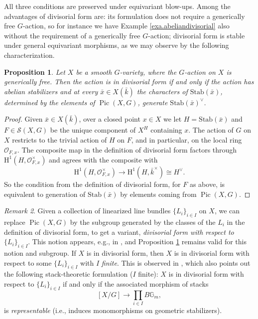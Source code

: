 \documentclass[12pt,reqno]{amsart}
\theoremstyle{plain}
\newtheorem{prop}{Proposition}[section]
\theoremstyle{remark}
\newtheorem{rema}[prop]{Remark}
\theoremstyle{definition}
\numberwithin{equation}{section}
\newcommand{\G}{{\mathbb G}}
\newcommand{\cO}{{\mathcal O}}
\newcommand{\rH}{{\mathrm H}}
\DeclareMathOperator{\Pic}{Pic}
\begin{document}
All three conditions are preserved under equivariant blow-ups.
Among the advantages of
divisorial form are: its formulation does not require a generically free $G$-action,
so for instance we have
Example \ref{exa.abeliandivisorial} also 
without the requirement of a generically free $G$-action;
divisorial form
is stable under general equivariant morphisms,
as we may observe by the following characterization.

\begin{prop}
\label{prop.divisorialform}
Let $X$ be a smooth $G$-variety, where the $G$-action on $X$ is generically free.
Then the action is in divisorial form if and only if the action has abelian stabilizers and at every $\bar x\in X(\bar k)$ the characters of $\mathrm{Stab}(\bar x)$, determined by the elements of $\Pic(X,G)$,
generate
$\mathrm{Stab}(\bar x)^\vee$.
\end{prop}

\begin{proof}
Given $\bar x\in X(\bar k)$, over a closed point $x\in X$ we let $H=\mathrm{Stab}(\bar x)$ and $F\in \mathcal{S}(X,G)$ be the unique component of $X^H$ containing $x$.
The action of $G$ on $X$ restricts to the trivial action of $H$ on $F$, and in particular, on the local ring $\cO_{F,x}$.
The composite map in the definition of divisorial form factors through $\rH^1(H,\cO_{F,x}^\times)$ and agrees with the composite with
\[ \rH^1(H,\cO_{F,x}^\times)\to \rH^1(H,\bar k^\times)\cong H^\vee. \]
So the condition from the definition of divisorial form, for $F$ as above, is equivalent to generation of $\mathrm{Stab}(\bar x)$ by elements coming from $\Pic(X,G)$.
\end{proof}



\begin{rema}
\label{rem.finmanylinebundles}
Given a collection of linearized line bundles $\{L_i\}_{i\in I}$ on $X$, we can replace $\Pic(X,G)$ by the subgroup generated by the classes of the $L_i$ in the definition of divisorial form, to get a
variant, \emph{divisorial form with respect to $\{L_i\}_{i\in I}$}.
This notion appears, e.g., in \cite[Sect.\ 5]{KT-struct},
and Proposition \ref{prop.divisorialform}
remains valid for this notion and subgroup.
If $X$ is in divisorial form, then $X$ is in
divisorial form with respect to some $\{L_i\}_{i\in I}$ with $I$ \emph{finite}.
This is observed in \cite[Remark 3.2]{BnG}, which also points out the following stack-theoretic formulation ($I$ finite):
$X$ is in divisorial form with respect to $\{L_i\}_{i\in I}$
if and only if
the associated morphism of stacks
\begin{equation}
\label{eqn.toproductBGm}
[X/G]\to \prod_{i\in I} B\G_m,
\end{equation}
is \emph{representable} (i.e., induces monomorphisms on geometric stabilizers).
\end{rema}
\end{document}
